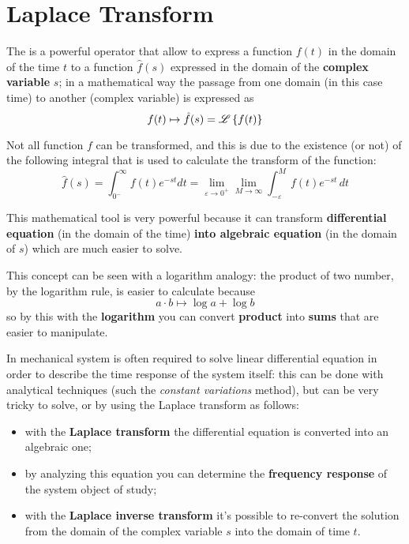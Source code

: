 \chapter{Laplace Transform}
	
	The  is a powerful operator that allow to express a function $f(t)$ in the domain of the time $t$ to a function $\hat f(s)$ expressed in the domain of the \textbf{complex variable} $s$; in a mathematical way the passage from one domain (in this case time) to another (complex variable) is expressed as 
	\[ f(t) \mapsto \hat f(s) = \mathscr{L} \left\{ f(t) \right\} \]
	
	Not all function $f$ can be transformed, and this is due to the existence (or not) of the following integral that is used to calculate the transform of the function:
	\begin{equation}
		\hat f(s) = \int_{0^-}^\infty f(t) e^{-st} dt = \lim_{\varepsilon\rightarrow 0^+} \lim_{M\rightarrow \infty} \int_{-\varepsilon}^M f(t) e^{-st}\, dt
	\end{equation}
	
	This mathematical tool is very powerful because it can transform \textbf{differential equation} (in the domain of the time) \textbf{into algebraic equation} (in the domain of $s$) which are much easier to solve.
	
	\begin{note}
		This concept can be seen with a logarithm analogy: the product of two number, by the logarithm rule, is easier to calculate because
		\[ a\cdot b \mapsto \log a + \log b \]
		so by this with the \textbf{logarithm} you can convert \textbf{product} into \textbf{sums} that are easier to manipulate.
	\end{note}

	In mechanical system is often required to solve linear differential equation in order to describe the time response of the system itself: this can be done with analytical techniques (such the \textit{constant variations} method), but can be very tricky to solve, or by using the Laplace transform as follows:
	\begin{itemize}
		\item with the \textbf{Laplace transform} the differential equation is converted into an algebraic one;
		\item by analyzing this equation you can determine the \textbf{frequency response} of the system object of study;
		\item with the \textbf{Laplace inverse transform} it's possible to re-convert the solution from the domain of the complex variable $s$ into the domain of time $t$. 
	\end{itemize}

